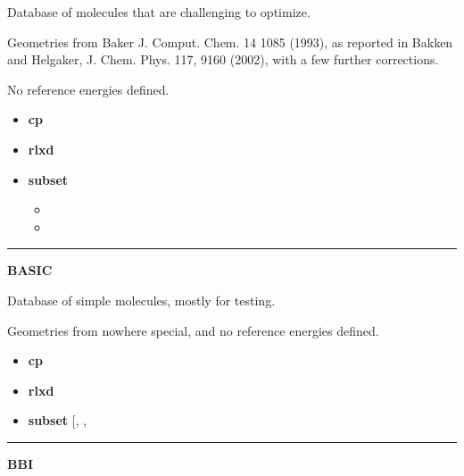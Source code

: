 \documentclass[letterpaper,10pt,english]{sphinxmanual}
\begin{document}
\begin{DUlineblock}{0em}
\item[] Database of molecules that are challenging to optimize.
\item[] Geometries from Baker J. Comput. Chem. 14 1085 (1993), as reported
in Bakken and Helgaker, J. Chem. Phys. 117, 9160 (2002), with a few
further corrections.
\item[] No reference energies defined.
\end{DUlineblock}
\begin{itemize}
\item {} 
\textbf{cp}  

\item {} 
\textbf{rlxd} 

\item {} 
\textbf{subset}
\begin{itemize}
\item {} 

\item {} 

\end{itemize}

\end{itemize}


\bigskip\hrule{}\bigskip

\label{db:module-BASIC}
\textbf{BASIC}

\begin{DUlineblock}{0em}
\item[] Database of simple molecules, mostly for testing.
\item[] Geometries from nowhere special, and no reference energies defined.
\end{DUlineblock}
\begin{itemize}
\item {} 
\textbf{cp}  

\item {} 
\textbf{rlxd} 

\item {} 
\textbf{subset} {[}, , \code{'ch4'}{]}

\end{itemize}


\bigskip\hrule{}\bigskip

\label{db:module-BBI}
\textbf{BBI}
\end{document}
